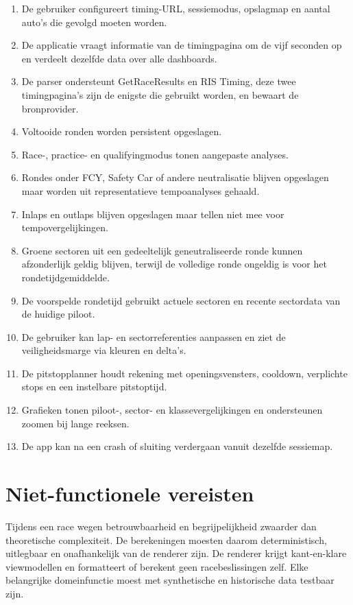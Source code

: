 \begin{enumerate}
  \item De gebruiker configureert timing-URL, sessiemodus, opslagmap en aantal auto's die gevolgd moeten worden.
  \item De applicatie vraagt informatie van de timingpagina om de vijf seconden op en verdeelt dezelfde data over alle dashboards.
  \item De parser ondersteunt GetRaceResults en RIS Timing, deze twee timingpagina's zijn de enigste die gebruikt worden, en bewaart de bronprovider.
  \item Voltooide ronden worden persistent opgeslagen.
  \item Race-, practice- en qualifyingmodus tonen aangepaste analyses.
  \item Rondes onder FCY, Safety Car of andere neutralisatie blijven opgeslagen maar worden uit
        representatieve tempoanalyses gehaald.
  \item Inlaps en outlaps blijven opgeslagen maar tellen niet mee voor tempovergelijkingen.
  \item Groene sectoren uit een gedeeltelijk geneutraliseerde ronde kunnen afzonderlijk geldig
        blijven, terwijl de volledige ronde ongeldig is voor het rondetijdgemiddelde.
  \item De voorspelde rondetijd gebruikt actuele sectoren en recente sectordata van de huidige
        piloot.
  \item De gebruiker kan lap- en sectorreferenties aanpassen en ziet de veiligheidsmarge via kleuren
        en delta's.
  \item De pitstopplanner houdt rekening met openingsvensters, cooldown, verplichte stops en een
        instelbare pitstoptijd.
  \item Grafieken tonen piloot-, sector- en klassevergelijkingen en ondersteunen zoomen bij lange
        reeksen.
  \item De app kan na een crash of sluiting verdergaan vanuit dezelfde sessiemap.
\end{enumerate}

\section{Niet-functionele vereisten}
Tijdens een race wegen betrouwbaarheid en begrijpelijkheid zwaarder dan theoretische complexiteit.
De berekeningen moesten daarom deterministisch, uitlegbaar en onafhankelijk van de renderer zijn. De
renderer krijgt kant-en-klare viewmodellen en formatteert of berekent geen racebeslissingen zelf.
Elke belangrijke domeinfunctie moest met synthetische en historische data testbaar zijn.

